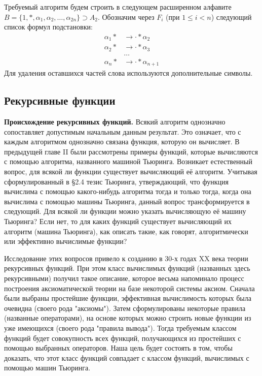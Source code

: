 \documentclass[a4paper,12pt]{article}
\begin{document}
Требуемый алгоритм будем строить в следующем расширенном алфавите \(B = \{1, *, \alpha_1, \alpha_2, \dots, \alpha_{2n}\} \supset A_2\). Обозначим через \(F_i\) (при \(1 \le i < n\)) следующий список формул подстановки:
\begin{align*}
\alpha_1 * &\to \cdot * \alpha_2 \\
\alpha_2 * &\to \cdot * \alpha_3 \\
&\dots \\
\alpha_{n} * &\to \cdot * \alpha_{n+1}
\end{align*}
Для удаления оставшихся частей слова используются дополнительные символы.

\subsection{Рекурсивные функции}

\textbf{Происхождение рекурсивных функций.} Всякий алгоритм однозначно сопоставляет допустимым начальным данным результат. Это означает, что с каждым алгоритмом однозначно связана функция, которую он вычисляет. В предыдущей главе II были рассмотрены примеры функций, которые вычисляются с помощью алгоритма, названного машиной Тьюринга. Возникает естественный вопрос, для всякой ли функции существует вычисляющий её алгоритм. Учитывая сформулированный в §2.4 тезис Тьюринга, утверждающий, что функция вычислима с помощью какого-нибудь алгоритма тогда и только тогда, когда она вычислима с помощью машины Тьюринга, данный вопрос трансформируется в следующий. Для всякой ли функции можно указать вычисляющую её машину Тьюринга? Если нет, то для каких функций существует вычисляющий их алгоритм (машина Тьюринга), как описать такие, как говорят, алгоритмически или эффективно вычислимые функции?

Исследование этих вопросов привело к созданию в 30-х годах XX века теории рекурсивных функций. При этом класс вычислимых функций (названных здесь рекурсивными) получил такое описание, которое весьма напоминало процесс построения аксиоматической теории на базе некоторой системы аксиом. Сначала были выбраны простейшие функции, эффективная вычислимость которых была очевидна (своего рода "аксиомы"). Затем сформулированы некоторые правила (названные операторами), на основе которых можно строить новые функции из уже имеющихся (своего рода "правила вывода"). Тогда требуемым классом функций будет совокупность всех функций, получающихся из простейших с помощью выбранных операторов. Наша цель будет состоять в том, чтобы доказать, что этот класс функций совпадает с классом функций, вычислимых с помощью машин Тьюринга.
\end{document}
